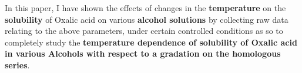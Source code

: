 {In this paper, I have shown the effects of changes in the \textbf{temperature} on the \textbf{solubility} of Oxalic acid on various \textbf{alcohol solutions} by collecting raw data relating to the above parameters, under certain controlled conditions as so to completely study the \textbf{temperature dependence of solubility of Oxalic acid in various Alcohols with respect to a gradation on the homologous series}.}



